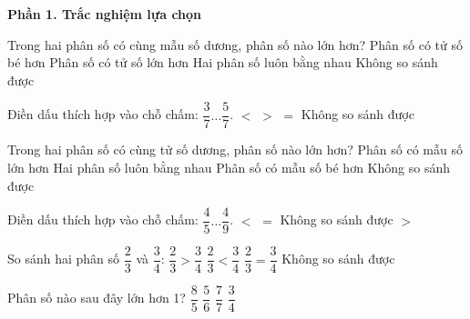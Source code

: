 \textbf{Phần 1. Trắc nghiệm lựa chọn}

\begin{ex} %
Trong hai phân số có cùng mẫu số dương, phân số nào lớn hơn?
\choice
{Phân số có tử số bé hơn}
{\True Phân số có tử số lớn hơn}
{Hai phân số luôn bằng nhau}
{Không so sánh được}
\end{ex}

\begin{ex} %
Điền dấu thích hợp vào chỗ chấm: $\dfrac{3}{7} \dots \dfrac{5}{7}$.
\choice
{\True $<$}
{$>$}
{$=$}
{Không so sánh được}
\end{ex}

\begin{ex} %
Trong hai phân số có cùng tử số dương, phân số nào lớn hơn?
\choice
{Phân số có mẫu số lớn hơn}
{Hai phân số luôn bằng nhau}
{\True Phân số có mẫu số bé hơn}
{Không so sánh được}
\end{ex}

\begin{ex} %
Điền dấu thích hợp vào chỗ chấm: $\dfrac{4}{5} \dots \dfrac{4}{9}$.
\choice
{$<$}
{$=$}
{Không so sánh được}
{\True $>$}
\end{ex}

\begin{ex} %
So sánh hai phân số $\dfrac{2}{3}$ và $\dfrac{3}{4}$:
\choice
{$\dfrac{2}{3} > \dfrac{3}{4}$}
{\True $\dfrac{2}{3} < \dfrac{3}{4}$}
{$\dfrac{2}{3} = \dfrac{3}{4}$}
{Không so sánh được}
\end{ex}

\begin{ex} %
Phân số nào sau đây lớn hơn 1?
\choice
{\True $\dfrac{8}{5}$}
{$\dfrac{5}{6}$}
{$\dfrac{7}{7}$}
{$\dfrac{3}{4}$}
\end{ex}

